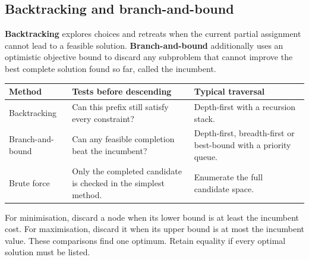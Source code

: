 \documentclass[12pt,a4paper]{article}
\begin{document}
\subsection{Backtracking and branch-and-bound}
\begin{tcolorbox}[defbox, title={Backtracking and branch-and-bound}]
\textbf{Backtracking} explores choices and retreats when the current partial assignment cannot lead to a feasible solution. \textbf{Branch-and-bound} additionally uses an optimistic objective bound to discard any subproblem that cannot improve the best complete solution found so far, called the incumbent.
\end{tcolorbox}

\begin{tcolorbox}[tikzbox, title={A state-space tree with two kinds of pruning}]
\centering
{}\par
\end{tcolorbox}

\par\vspace{5pt}
\begingroup
\setlength{\extrarowheight}{1pt}
\noindent\begin{tabularx}{\linewidth}{|B{3.55cm}|Y|Y|}
\hline
\textbf{Method} & \textbf{Tests before descending} & \textbf{Typical traversal} \\ \hline
Backtracking & Can this prefix still satisfy every constraint? & Depth-first with a recursion stack. \\ \hline
Branch-and-bound & Can any feasible completion beat the incumbent? & Depth-first, breadth-first or best-bound with a priority queue. \\ \hline
Brute force & Only the completed candidate is checked in the simplest method. & Enumerate the full candidate space. \\ \hline
\end{tabularx}\par
\endgroup
\begin{tcolorbox}[formulabox, title={Safe objective pruning}]
For minimisation, discard a node when its lower bound is at least the incumbent cost. For maximisation, discard it when its upper bound is at most the incumbent value. These comparisons find one optimum. Retain equality if every optimal solution must be listed.
\end{tcolorbox}
\end{document}
